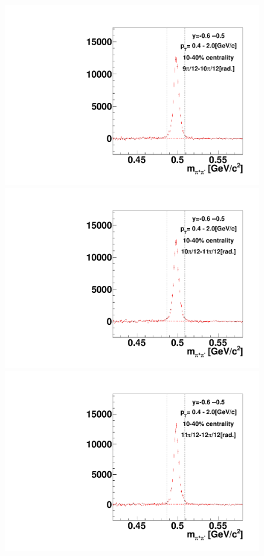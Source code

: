 \begin{figure}[h]
\includegraphics[width=0.14\linewidth]{chapterX/fig/ks_v1_sig/kf_ptslice0_cent1_ks_flow_phi10_rap10.pdf}
\includegraphics[width=0.14\linewidth]{chapterX/fig/ks_v1_sig/kf_ptslice0_cent1_ks_flow_phi11_rap10.pdf}
\includegraphics[width=0.14\linewidth]{chapterX/fig/ks_v1_sig/kf_ptslice0_cent1_ks_flow_phi12_rap10.pdf}


\end{figure}
